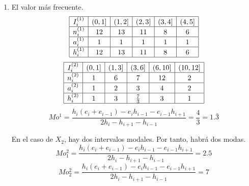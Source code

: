 \begin{ejercicio}
\begin{enumerate}
\begin{itemize}
        \end{itemize}

        \item El valor más frecuente.
        \begin{equation*}
            \begin{array}{|c|c|c|c|c|c|}
                \hline
                I_i^{(1)} & (0,1] & (1,2] & (2,3] & (3,4] & (4,5]  \\ \hline
                n_i^{(1)} & 12& 13 & 11 & 8 & 6 \\ \hline 
                a_i^{(1)} & 1& 1 & 1 & 1 & 1 \\ \hline 
                h_i^{(1)} & 12& 13 & 11 & 8 & 6 \\ \hline 
            \end{array}
        \end{equation*}
        \begin{equation*}
            \begin{array}{|c|c|c|c|c|c|}
                \hline
                I_i^{(2)} & (0,1] & (1,3] & (3,6] & (6,10] & (10,12]  \\ \hline
                n_i^{(2)} & 1& 6 & 7 & 12 & 2 \\ \hline
                a_i^{(2)} & 1& 2 &3 & 4 & 2 \\ \hline 
                h_i^{(2)} & 1& 3 & \frac{7}{3} & 3 & 1 \\ \hline 
            \end{array}
        \end{equation*}
        $$Mo^1 = \frac{h_i(e_i+e_{i-1})-e_ih_{i-1} - e_{i-1}h_{i+1}}{2h_i-h_{i+1}-h_{i-1}} = \frac{4}{3} = 1.\bar{3}$$

        En el caso de $X_2$, hay dos intervalos modales. Por tanto, habrá dos modas.
        $$Mo^2_1 = \frac{h_i(e_i+e_{i-1})-e_ih_{i-1} - e_{i-1}h_{i+1}}{2h_i-h_{i+1}-h_{i-1}} = 2.5$$
        $$Mo^2_2 = \frac{h_i(e_i+e_{i-1})-e_ih_{i-1} - e_{i-1}h_{i+1}}{2h_i-h_{i+1}-h_{i-1}} = 7$$


\end{enumerate}
\end{ejercicio}
